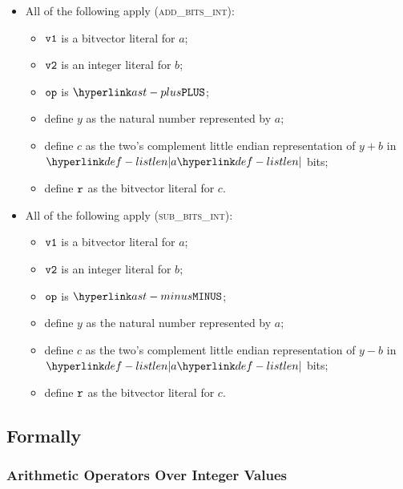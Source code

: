 \begin{itemize}
  \item All of the following apply (\textsc{add\_bits\_int}):
  \begin{itemize}
    \item $\vvone$ is a bitvector literal for $a$;
    \item $\vvtwo$ is an integer literal for $b$;
    \item $\op$ is $\PLUS$;
    \item define $y$ as the natural number represented by $a$;
    \item define $c$ as the two's complement little endian representation of $y+b$ in $\listlen{a}$ bits;
    \item define $\vr$ as the bitvector literal for $c$.
  \end{itemize}

  \item All of the following apply (\textsc{sub\_bits\_int}):
  \begin{itemize}
    \item $\vvone$ is a bitvector literal for $a$;
    \item $\vvtwo$ is an integer literal for $b$;
    \item $\op$ is $\MINUS$;
    \item define $y$ as the natural number represented by $a$;
    \item define $c$ as the two's complement little endian representation of $y-b$ in $\listlen{a}$ bits;
    \item define $\vr$ as the bitvector literal for $c$.
  \end{itemize}
\end{itemize}

\subsection{Formally}

\begin{mathpar}
\end{mathpar}

\subsubsection{Arithmetic Operators Over Integer Values \label{sec:AthimeticOverInt}}
\begin{mathpar}
\end{mathpar}

